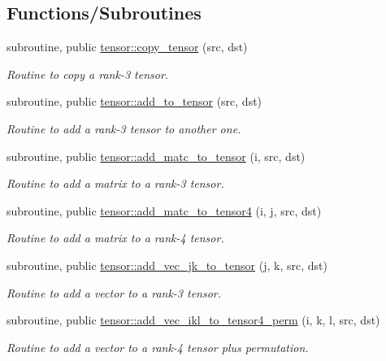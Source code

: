 \subsection*{Functions/\+Subroutines}
\begin{DoxyCompactItemize}
\item 
subroutine, public \hyperlink{namespacetensor_a4a88ee8077278486c5128ad97617969e}{tensor\+::copy\+\_\+tensor} (src, dst)
\begin{DoxyCompactList}\small\item\em Routine to copy a rank-\/3 tensor. \end{DoxyCompactList}\item 
subroutine, public \hyperlink{namespacetensor_aad7cd55f3a4cec4676cc7ca34b05f1a8}{tensor\+::add\+\_\+to\+\_\+tensor} (src, dst)
\begin{DoxyCompactList}\small\item\em Routine to add a rank-\/3 tensor to another one. \end{DoxyCompactList}\item 
subroutine, public \hyperlink{namespacetensor_a4c63a1dd16bf751220f016b41bdaa78c}{tensor\+::add\+\_\+matc\+\_\+to\+\_\+tensor} (i, src, dst)
\begin{DoxyCompactList}\small\item\em Routine to add a matrix to a rank-\/3 tensor. \end{DoxyCompactList}\item 
subroutine, public \hyperlink{namespacetensor_ab32e3f9d0aab15d2fa34dc3e509ee8bf}{tensor\+::add\+\_\+matc\+\_\+to\+\_\+tensor4} (i, j, src, dst)
\begin{DoxyCompactList}\small\item\em Routine to add a matrix to a rank-\/4 tensor. \end{DoxyCompactList}\item 
subroutine, public \hyperlink{namespacetensor_aaa98410f224bc3dfb96cd7031f56e916}{tensor\+::add\+\_\+vec\+\_\+jk\+\_\+to\+\_\+tensor} (j, k, src, dst)
\begin{DoxyCompactList}\small\item\em Routine to add a vector to a rank-\/3 tensor. \end{DoxyCompactList}\item 
subroutine, public \hyperlink{namespacetensor_a9e443c5b0f095efdbb0df2e876b760be}{tensor\+::add\+\_\+vec\+\_\+ikl\+\_\+to\+\_\+tensor4\+\_\+perm} (i, k, l, src, dst)
\begin{DoxyCompactList}\small\item\em Routine to add a vector to a rank-\/4 tensor plus permutation. \end{DoxyCompactList}\item 

\end{DoxyCompactItemize}
